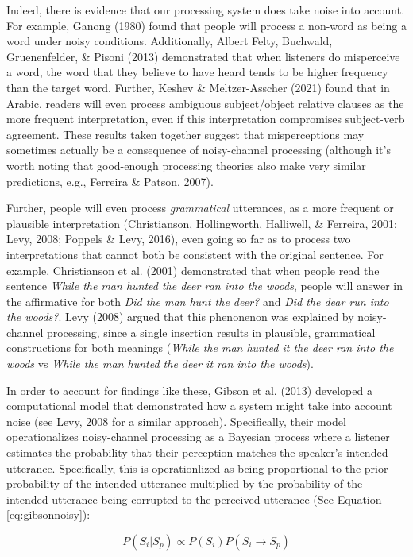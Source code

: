 \documentclass[10pt, letterpaper]{article}
\begin{document}
Indeed, there is evidence that our processing system does take noise
into account. For example, Ganong (1980) found that people will process
a non-word as being a word under noisy conditions. Additionally, Albert
Felty, Buchwald, Gruenenfelder, \& Pisoni (2013) demonstrated that when
listeners do misperceive a word, the word that they believe to have
heard tends to be higher frequency than the target word. Further, Keshev
\& Meltzer-Asscher (2021) found that in Arabic, readers will even
process ambiguous subject/object relative clauses as the more frequent
interpretation, even if this interpretation compromises subject-verb
agreement. These results taken together suggest that misperceptions may
sometimes actually be a consequence of noisy-channel processing
(although it's worth noting that good-enough processing theories also
make very similar predictions, e.g., Ferreira \& Patson, 2007).

Further, people will even process \emph{grammatical} utterances, as a
more frequent or plausible interpretation (Christianson, Hollingworth,
Halliwell, \& Ferreira, 2001; Levy, 2008; Poppels \& Levy, 2016), even
going so far as to process two interpretations that cannot both be
consistent with the original sentence. For example, Christianson et al.
(2001) demonstrated that when people read the sentence \emph{While the
man hunted the deer ran into the woods}, people will answer in the
affirmative for both \emph{Did the man hunt the deer?} and \emph{Did the
dear run into the woods?}. Levy (2008) argued that this phenonenon was
explained by noisy-channel processing, since a single insertion results
in plausible, grammatical constructions for both meanings (\emph{While
the man hunted it the deer ran into the woods} vs \emph{While the man
hunted the deer it ran into the woods}).

In order to account for findings like these, Gibson et al. (2013)
developed a computational model that demonstrated how a system might
take into account noise (see Levy, 2008 for a similar approach).
Specifically, their model operationalizes noisy-channel processing as a
Bayesian process where a listener estimates the probability that their
perception matches the speaker's intended utterance. Specifically, this
is operationlized as being proportional to the prior probability of the
intended utterance multiplied by the probability of the intended
utterance being corrupted to the perceived utterance (See Equation
\ref{eq:gibsonnoisy}):

\begin{equation}
\label{eq:gibsonnoisy}
P(S_i|S_p) \propto P(S_i) P(S_i \to S_p)
\end{equation}
\end{document}
